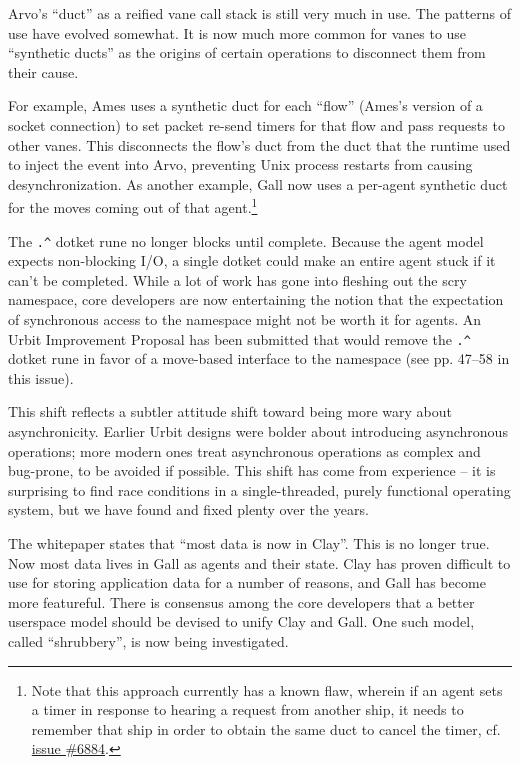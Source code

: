 \documentclass[twoside]{article}
\begin{document}
Arvo's ``duct'' as a reified vane call stack is still very much in use.  The patterns of use have evolved somewhat.  It is now much more common for vanes to use ``synthetic ducts'' as the origins of certain operations to disconnect them from their cause.

For example, Ames uses a synthetic duct for each ``flow'' (Ames's version of a socket connection) to set packet re-send timers for that flow and pass requests to other vanes.  This disconnects the flow's duct from the duct that the runtime used to inject the event into Arvo, preventing Unix process restarts from causing desynchronization.  As another example, Gall now uses a per-agent synthetic duct for the moves coming out of that agent.\footnote{Note that this approach currently has a known flaw, wherein if an agent sets a timer in response to hearing a request from another ship, it needs to remember that ship in order to obtain the same duct to cancel the timer, cf. \href{https://github.com/urbit/urbit/issues/6884}{issue \#6884}.}

The \lstinline[style=inlinecode]{.^} dotket rune no longer blocks until complete.  Because the agent model expects non-blocking I/O, a single dotket could make an entire agent stuck if it can't be completed.  While a lot of work has gone into fleshing out the scry namespace, core developers are now entertaining the notion that the expectation of synchronous access to the namespace might not be worth it for agents.  An Urbit Improvement Proposal has been submitted that would remove the \lstinline[style=inlinecode]{.^} dotket rune in favor of a move-based interface to the namespace (see pp. 47–58 in this issue).

This shift reflects a subtler attitude shift toward being more wary about asynchronicity.  Earlier Urbit designs were bolder about introducing asynchronous operations; more modern ones treat asynchronous operations as complex and bug-prone, to be avoided if possible.  This shift has come from experience – it is surprising to find race conditions in a single-threaded, purely functional operating system, but we have found and fixed plenty over the years.  

The whitepaper states that ``most data is now in Clay''.  This is no longer true.  Now most data lives in Gall as agents and their state.  Clay has proven difficult to use for storing application data for a number of reasons, and Gall has become more featureful.  There is consensus among the core developers that a better userspace model should be devised to unify Clay and Gall.  One such model, called ``shrubbery'', is now being investigated.
\end{document}
